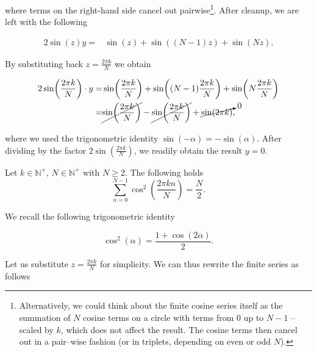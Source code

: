 where terms on the right-hand side cancel out pairwise\footnote{Alternatively, we could think about the finite cosine series itself as the summation of $N$ cosine terms on a circle with terms from $0$ up to $N-1$ -- scaled by $k$, which does not affect the result. The cosine terms then cancel out in a pair--wise fashion (or in triplets, depending on even or odd $N$).}. After cleanup, we are left with the following 

\begin{equation}
    \begin{aligned}
        2 \sin(z) y =&  \sin(z) + \sin((N-1)z) + \sin(N z).
    \end{aligned}
\end{equation}

By substituting back $z = \frac{2 \pi k}{N}$ we obtain

\begin{equation}
    \begin{aligned}
        2 \sin(\frac{2 \pi k}{N}) \cdot y =&  \sin(\frac{2 \pi k}{N}) + \sin((N-1)\frac{2 \pi k}{N}) + \sin(N \frac{2 \pi k}{N})\\
        =&  \cancel{\sin(\frac{2 \pi k}{N})} - \cancel{\sin(\frac{2 \pi k}{N})} + \cancelto{0}{\sin(2 \pi k)},
    \end{aligned}
\end{equation}

where we used the trigonometric identity $\sin(-\alpha) = - \sin(\alpha)$. After dividing by the factor $ 2 \sin(\frac{2 \pi k}{N})$, we readily obtain the result $y = 0$.

\endproof
%
\begin{lemma} \label{lem:finite-cosine-series-squared}
    Let $k\in \mathbb{N}^+$, $N\in \mathbb{N}^+$ with $N \geq 2$. The following holds
    \begin{equation}
    \sum_{n=0}^{N-1} \cos^2 \left( \frac{2 \pi k n}{N} \right) = \frac{N}{2}.
    \end{equation}
\end{lemma}
\proof
We recall the following trigonometric identity

\begin{equation}
    \cos^2(\alpha) = \frac{1 + \cos(2\alpha)}{2}.
\end{equation}

Let us substitute $z = \frac{2 \pi k}{N}$ for simplicity. We can thus rewrite the finite series as follows

